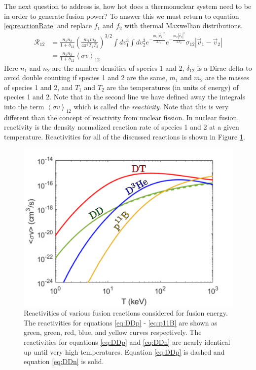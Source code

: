 The next question to address is, how hot does a thermonuclear system need to be in order to generate fusion power? To answer this we must return to equation \ref{eq:reactionRate} and replace $f_1$ and $f_2$ with thermal Maxwellian distributions. 
%
\begin{equation}
	\begin{split}
		\mathcal{R}_{12}  & = \frac{n_1n_2}{1+\delta_{12}} \left(\frac{m_1 m_2}{4\pi^2T_1T_2}\right)^{3/2} \int dv_1^3 \int dv_2^3  e^{-\frac{m_1|\vec{v}_1|^2}{2T_1}} e^{-\frac{m_2|\vec{v}_2|^2}{2T_2}} \sigma_{12} \left|\vec{v}_1 - \vec{v}_2\right| \\
		& = \frac{n_1n_2}{1+\delta_{12}} \left<\sigma v\right>_{12}
	\end{split}
	\label{eq:reactionRateThermal}
\end{equation}
%
Here $n_1$ and $n_2$ are the number densities of species 1 and 2, $\delta_{12}$ is a Dirac delta to avoid double counting if species 1 and 2 are the same, $m_1$ and $m_2$ are the masses of species 1 and 2, and $T_1$ and $T_2$ are the temperatures (in units of energy) of species 1 and 2. Note that in the second line we have defined away the integrals into the term $\left<\sigma v\right>_{12}$ which is called the \emph{reactivity}. Note that this is very different than the concept of reactivity from nuclear fission. In nuclear fusion, reactivity is the density normalized reaction rate of species 1 and 2 at a given temperature. Reactivities for all of the discussed reactions is shown in Figure \ref{fig:reactivities}.  

\begin{figure}[h!]
	\centering
	\includegraphics[scale=0.7]{Figures/reactivities.pdf}
	\caption[Fusion Reactivities]{Reactivities of various fusion reactions considered for fusion energy. The reactivities for equations \ref{eq:DDp} - \ref{eq:p11B} are shown as green, green, red, blue, and yellow curves respectively. The reactivities for equations \ref{eq:DDp} and \ref{eq:DDn} are nearly identical up until very high temperatures. Equation \ref{eq:DDp} is dashed and equation \ref{eq:DDn} is solid.  }
	\label{fig:reactivities}
\end{figure}
